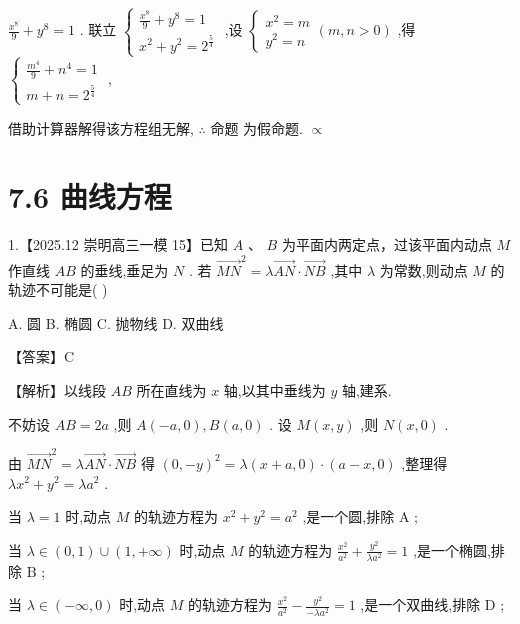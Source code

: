 \documentclass[10pt]{article}
\newcommand*\circled[1]{\tikz[baseline=(char.base)]{\node[shape=circle,draw,inner sep=1.5pt] (char) {\small #1};}}
\begin{document}
\(\frac{{x}^{8}}{9} + {y}^{8} = 1\) . 联立 \(\left\{  \begin{array}{l} \frac{{x}^{8}}{9} + {y}^{8} = 1 \\  {x}^{2} + {y}^{2} = {2}^{\frac{5}{4}} \end{array}\right.\) ,设 \(\left\{  {\begin{array}{l} {x}^{2} = m \\  {y}^{2} = n \end{array}\left( {m,n > 0}\right) }\right.\) ,得 \(\left\{  \begin{array}{l} \frac{{m}^{4}}{9} + {n}^{4} = 1 \\  m + n = {2}^{\frac{5}{4}} \end{array}\right.\) ,

借助计算器解得该方程组无解, \(\therefore\) 命题 \circled{2} 为假命题. \(\propto\)

\section*{7.6 曲线方程}

1.【2025.12 崇明高三一模 15】已知 \(A\text{ 、 }B\) 为平面内两定点，过该平面内动点 \(M\) 作直线 \({AB}\) 的垂线,垂足为 \(N\) . 若 \({\overrightarrow{MN}}^{2} = \lambda \overrightarrow{AN} \cdot  \overrightarrow{NB}\) ,其中 \(\lambda\) 为常数,则动点 \(M\) 的轨迹不可能是( )

A. 圆 B. 椭圆 C. 抛物线 D. 双曲线

【答案】C

【解析】以线段 \({AB}\) 所在直线为 \(x\) 轴,以其中垂线为 \(y\) 轴,建系.

不妨设 \({AB} = {2a}\) ,则 \(A\left( {-a,0}\right) ,B\left( {a,0}\right)\) . 设 \(M\left( {x,y}\right)\) ,则 \(N\left( {x,0}\right)\) .

由 \({\overrightarrow{MN}}^{2} = \lambda \overrightarrow{AN} \cdot  \overrightarrow{NB}\) 得 \({\left( 0, - y\right) }^{2} = \lambda \left( {x + a,0}\right)  \cdot  \left( {a - x,0}\right)\) ,整理得 \(\lambda {x}^{2} + {y}^{2} = \lambda {a}^{2}\) .

当 \(\lambda  = 1\) 时,动点 \(M\) 的轨迹方程为 \({x}^{2} + {y}^{2} = {a}^{2}\) ,是一个圆,排除 \(\mathrm{A}\) ;

当 \(\lambda  \in  \left( {0,1}\right)  \cup  \left( {1, + \infty }\right)\) 时,动点 \(M\) 的轨迹方程为 \(\frac{{x}^{2}}{{a}^{2}} + \frac{{y}^{2}}{\lambda {a}^{2}} = 1\) ,是一个椭圆,排除 \(\mathrm{B}\) ;

当 \(\lambda  \in  \left( {-\infty ,0}\right)\) 时,动点 \(M\) 的轨迹方程为 \(\frac{{x}^{2}}{{a}^{2}} - \frac{{y}^{2}}{-\lambda {a}^{2}} = 1\) ,是一个双曲线,排除 \(\mathrm{D}\) ;
\end{document}
